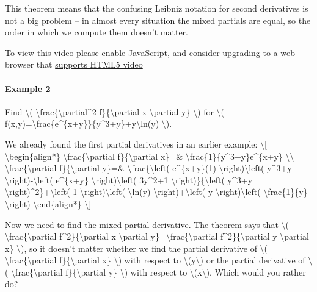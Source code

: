 This theorem means that the confusing Leibniz notation for second
derivatives is not a big problem -- in almost every situation the mixed
partials are equal, so the order in which we compute them doesn't
matter.

To view this video please enable JavaScript, and consider upgrading to a
web browser that \href{http://videojs.com/html5-video-support/}{supports
HTML5 video}

\hypertarget{example-2}{%
\paragraph{Example 2}\label{example-2}}

Find \textbackslash{}(
\textbackslash{}frac\{\textbackslash{}partial\^{}2
f\}\{\textbackslash{}partial x \textbackslash{}partial y\}
\textbackslash{}) for \textbackslash{}(
f(x,y)=\textbackslash{}frac\{e\^{}\{x+y\}\}\{y\^{}3+y\}+y\textbackslash{}ln(y)
\textbackslash{}).

We already found the first partial derivatives in an earlier example:
\textbackslash{}{[} \textbackslash{}begin\{align*\}
\textbackslash{}frac\{\textbackslash{}partial
f\}\{\textbackslash{}partial x\}=\&
\textbackslash{}frac\{1\}\{y\^{}3+y\}e\^{}\{x+y\}
\textbackslash{}\textbackslash{}
\textbackslash{}frac\{\textbackslash{}partial
f\}\{\textbackslash{}partial y\}=\&
\textbackslash{}frac\{\textbackslash{}left( e\^{}\{x+y\}(1)
\textbackslash{}right)\textbackslash{}left( y\^{}3+y
\textbackslash{}right)-\textbackslash{}left( e\^{}\{x+y\}
\textbackslash{}right)\textbackslash{}left( 3y\^{}2+1
\textbackslash{}right)\}\{\textbackslash{}left( y\^{}3+y
\textbackslash{}right)\^{}2\}+\textbackslash{}left( 1
\textbackslash{}right)\textbackslash{}left( \textbackslash{}ln(y)
\textbackslash{}right)+\textbackslash{}left( y
\textbackslash{}right)\textbackslash{}left(
\textbackslash{}frac\{1\}\{y\} \textbackslash{}right)
\textbackslash{}end\{align*\} \textbackslash{}{]}

Now we need to find the mixed partial derivative. The theorem says that
\textbackslash{}( \textbackslash{}frac\{\textbackslash{}partial
f\^{}2\}\{\textbackslash{}partial x \textbackslash{}partial
y\}=\textbackslash{}frac\{\textbackslash{}partial
f\^{}2\}\{\textbackslash{}partial y \textbackslash{}partial x\}
\textbackslash{}), so it doesn't matter whether we find the partial
derivative of \textbackslash{}(
\textbackslash{}frac\{\textbackslash{}partial
f\}\{\textbackslash{}partial x\} \textbackslash{}) with respect to
\textbackslash{}(y\textbackslash{}) or the partial derivative of
\textbackslash{}( \textbackslash{}frac\{\textbackslash{}partial
f\}\{\textbackslash{}partial y\} \textbackslash{}) with respect to
\textbackslash{}(x\textbackslash{}). Which would you rather do?

